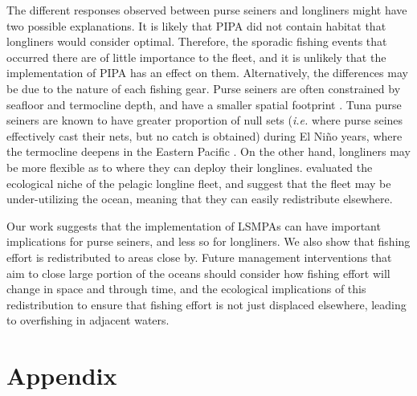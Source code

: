 \documentclass[12pt,]{article}
\begin{document}
The different responses observed between purse seiners and longliners
might have two possible explanations. It is likely that PIPA did not
contain habitat that longliners would consider optimal. Therefore, the
sporadic fishing events that occurred there are of little importance to
the fleet, and it is unlikely that the implementation of PIPA has an
effect on them. Alternatively, the differences may be due to the nature
of each fishing gear. Purse seiners are often constrained by seafloor
and termocline depth, and have a smaller spatial footprint
\citep{kroodsma_2018}. Tuna purse seiners are known to have greater
proportion of null sets (\emph{i.e.} where purse seines effectively cast
their nets, but no catch is obtained) during El Niño years, where the
termocline deepens in the Eastern Pacific \citep{dreyfusleon_2015}. On
the other hand, longliners may be more flexible as to where they can
deploy their longlines. \citet{ortuocrespo_2018} evaluated the
ecological niche of the pelagic longline fleet, and suggest that the
fleet may be under-utilizing the ocean, meaning that they can easily
redistribute elsewhere.

Our work suggests that the implementation of LSMPAs can have important
implications for purse seiners, and less so for longliners. We also show
that fishing effort is redistributed to areas close by. Future
management interventions that aim to close large portion of the oceans
should consider how fishing effort will change in space and through
time, and the ecological implications of this redistribution to ensure
that fishing effort is not just displaced elsewhere, leading to
overfishing in adjacent waters.

\clearpage

\hypertarget{appendix}{%
\section{Appendix}\label{appendix}}
\end{document}
